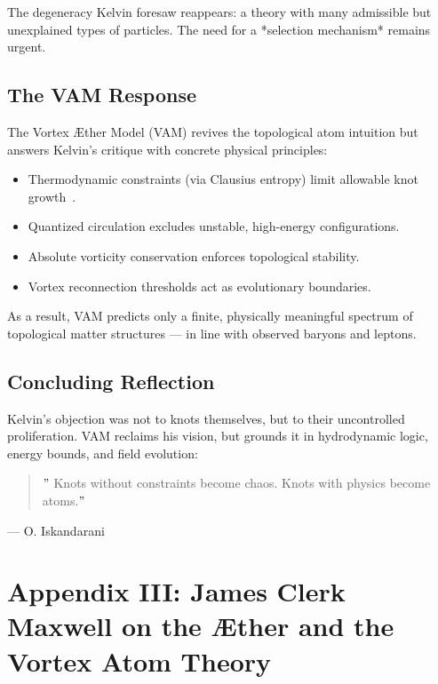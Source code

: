 \documentclass[preprint,notitlepage]{revtex4-2}
\begin{document}
    The degeneracy Kelvin foresaw reappears: a theory with many admissible but unexplained types of particles. The need for a *selection mechanism* remains urgent.

    \subsection*{The VAM Response}

    The Vortex Æther Model (VAM) revives the topological atom intuition but answers Kelvin's critique with concrete physical principles:

    \begin{itemize}
      \item Thermodynamic constraints (via Clausius entropy) limit allowable knot growth~\cite{clausius1865entropy}.
      \item Quantized circulation excludes unstable, high-energy configurations.
      \item Absolute vorticity conservation enforces topological stability.
      \item Vortex reconnection thresholds act as evolutionary boundaries.
    \end{itemize}

    As a result, VAM predicts only a finite, physically meaningful spectrum of topological matter structures — in line with observed baryons and leptons.

    \subsection*{Concluding Reflection}

    Kelvin's objection was not to knots themselves, but to their uncontrolled proliferation. VAM reclaims his vision, but grounds it in hydrodynamic logic, energy bounds, and field evolution:

    \begin{quote}
     \("\) Knots without constraints become chaos. Knots with physics become atoms.\("\)
    \end{quote}
   \hfill — O. Iskandarani

\section*{Appendix III: James Clerk Maxwell on the Æther and the Vortex Atom Theory}
\label{appendix:maxwell}
\end{document}
